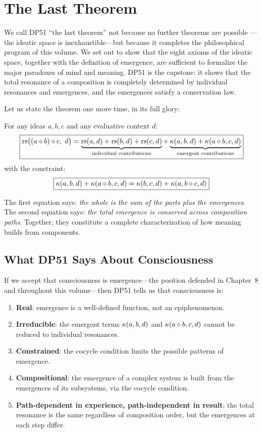 \section{The Last Theorem}

We call DP51 ``the last theorem'' not because no further theorems are possible
---the ideatic space is inexhaustible---but because it completes the
philosophical program of this volume.  We set out to show that the eight axioms
of the ideatic space, together with the definition of emergence, are sufficient
to formalize the major paradoxes of mind and meaning.  DP51 is the capstone:
it shows that the total resonance of a composition is completely determined by
individual resonances and emergences, and the emergences satisfy a conservation
law.

Let us state the theorem one more time, in its full glory:

\begin{theorem}
\label{thm:last-theorem}
For any ideas $a, b, c$ and any evaluative context $d$:
\[
\boxed{
\mathrm{rs}\bigl((a \circ b) \circ c,\; d\bigr)
= \underbrace{\mathrm{rs}(a, d) + \mathrm{rs}(b, d) + \mathrm{rs}(c, d)}_{\text{individual contributions}}
+ \underbrace{\kappa(a, b, d) + \kappa(a \circ b, c, d)}_{\text{emergent contributions}}
}
\]
with the constraint:
\[
\boxed{
\kappa(a, b, d) + \kappa(a \circ b, c, d)
= \kappa(b, c, d) + \kappa(a, b \circ c, d)
}
\]
\end{theorem}

The first equation says: \emph{the whole is the sum of the parts plus the
emergences}.  The second equation says: \emph{the total emergence is
conserved across composition paths}.  Together, they constitute a complete
characterization of how meaning builds from components.

\subsection{What DP51 Says About Consciousness}

If we accept that consciousness is emergence---the position defended in
Chapter~8 and throughout this volume---then DP51 tells us that consciousness
is:
\begin{enumerate}
\item \textbf{Real}: emergence is a well-defined function, not an epiphenomenon.
\item \textbf{Irreducible}: the emergent terms $\kappa(a, b, d)$ and
  $\kappa(a \circ b, c, d)$ cannot be reduced to individual resonances.
\item \textbf{Constrained}: the cocycle condition limits the possible patterns
  of emergence.
\item \textbf{Compositional}: the emergence of a complex system is built from
  the emergences of its subsystems, via the cocycle condition.
\item \textbf{Path-dependent in experience, path-independent in result}: the
  total resonance is the same regardless of composition order, but the
  emergences at each step differ.
\end{enumerate}

